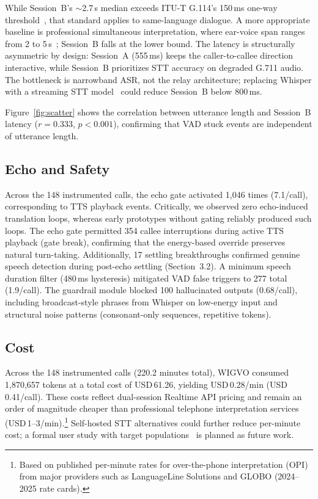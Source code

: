 \documentclass[11pt]{article}
\begin{document}
While Session~B's ${\sim}$2.7\,s median exceeds ITU-T G.114's 150\,ms one-way threshold~\citep{itu_g114_2003}, that standard applies to same-language dialogue. A more appropriate baseline is professional simultaneous interpretation, where ear-voice span ranges from 2 to 5\,s~\citep{goldman_eisler_1972,timarova_2011_evs}; Session~B falls at the lower bound. The latency is structurally asymmetric by design: Session~A (555\,ms) keeps the caller-to-callee direction interactive, while Session~B prioritizes STT accuracy on degraded G.711 audio. The bottleneck is narrowband ASR, not the relay architecture; replacing Whisper with a streaming STT model~\citep{kyutai2025stt} could reduce Session~B below 800\,ms.

Figure~\ref{fig:scatter} shows the correlation between utterance length and Session~B latency ($r=0.333$, $p < 0.001$), confirming that VAD stuck events are independent of utterance length.

\subsection{Echo and Safety}

Across the 148 instrumented calls, the echo gate activated 1{,}046 times (7.1/call), corresponding to TTS playback events. Critically, we observed zero echo-induced translation loops, whereas early prototypes without gating reliably produced such loops. The echo gate permitted 354 callee interruptions during active TTS playback (gate break), confirming that the energy-based override preserves natural turn-taking. Additionally, 17 settling breakthroughs confirmed genuine speech detection during post-echo settling (Section~3.2). A minimum speech duration filter (480\,ms hysteresis) mitigated VAD false triggers to 277 total (1.9/call). The guardrail module blocked 100 hallucinated outputs (0.68/call), including broadcast-style phrases from Whisper on low-energy input and structural noise patterns (consonant-only sequences, repetitive tokens).

\subsection{Cost}

Across the 148 instrumented calls (220.2 minutes total), WIGVO consumed 1{,}870{,}657 tokens at a total cost of USD\,61.26, yielding USD\,0.28/min (USD\,0.41/call). These costs reflect dual-session Realtime API pricing and remain an order of magnitude cheaper than professional telephone interpretation services (USD\,1--3/min).\footnote{Based on published per-minute rates for over-the-phone interpretation (OPI) from major providers such as LanguageLine Solutions and GLOBO (2024--2025 rate cards).} Self-hosted STT alternatives could further reduce per-minute cost; a formal user study with target populations~\citep{brooke_sus_1996} is planned as future work.
\end{document}
